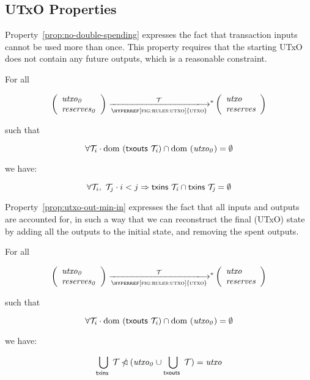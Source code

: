 \subsection{UTxO Properties}
\label{sec:utxo-properties}

Property~\ref{prop:no-double-spending} expresses the fact that transaction
inputs cannot be used more than once. This property requires that the starting
UTxO does not contain any future outputs, which is a reasonable constraint.

\begin{property}\label{prop:no-double-spending}
  For all

  $$
  \left(
    \begin{array}{l}
      \var{utxo_0}\\
      \var{reserves_0}
    \end{array}
  \right)
  \transtar{\hyperref[fig:rules:utxo]{utxo}}{\txs}
  \left(
    \begin{array}{l}
      \var{utxo}\\
      \var{reserves}
    \end{array}
  \right)
  $$

  such that

  $$
    \forall \mathcal{T}_i \cdot \operatorname{dom}~(\mathsf{txouts}~ \mathit{\mathcal{T}_i}) \cap \operatorname{dom}~(\mathit{utxo_0}) = \emptyset
  $$

  we have:

  $$
  \forall \mathcal{T}_i,~\mathcal{T}_j \cdot i < j \Rightarrow \mathsf{txins}~ \mathit{\mathcal{T}_i} \cap \mathsf{txins}~ \mathit{\mathcal{T}_j} = \emptyset
  $$
\end{property}

Property~\ref{prop:utxo-out-min-in} expresses the fact that all inputs and
outputs are accounted for, in such a way that we can reconstruct the final
(UTxO) state by adding all the outputs to the initial state, and removing the
spent outputs.

\begin{property}\label{prop:utxo-out-min-in}
  For all

  $$
  \left(
    \begin{array}{l}
      \var{utxo_0}\\
      \var{reserves_0}
    \end{array}
  \right)
  \transtar{\hyperref[fig:rules:utxo]{utxo}}{\txs}
  \left(
    \begin{array}{l}
      \var{utxo}\\
      \var{reserves}
    \end{array}
  \right)
  $$

  such that

  $$
    \forall \mathcal{T}_i \cdot \operatorname{dom}~(\mathsf{txouts}~ \mathit{\mathcal{T}_i}) \cap \operatorname{dom}~(\mathit{utxo_0}) = \emptyset
  $$

  we have:

  $$
  \bigcup_{\mathsf{txins}~ \mathit{}} \mathcal{T} \mathbin{\slashed{\lhd}} (\mathit{utxo_0} \cup \bigcup_{\mathsf{txouts}~ \mathit{}} \mathcal{T}) = \mathit{utxo}
  $$

\end{property}


